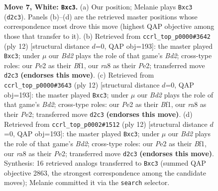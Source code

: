 \documentclass[11pt]{article}
\begin{document}
\begin{figure}[p]
\caption{\textbf{Move 7, White: \texttt{Bxc3}.} (a) Our position; Melanie plays \texttt{Bxc3} (\texttt{d2c3}). Panels (b)--(d) are the retrieved master positions whose correspondence most drove this move (highest QAP objective among those that transfer to it). (b) Retrieved from \texttt{ccrl\_top\_p0000\#3642} (ply 12) [structural distance $d$=0, QAP obj=193]: the master played \texttt{Bxc3}; under $\mu$ our \emph{Bd2} plays the role of that game's \emph{Bd2}; cross-type roles: our \emph{P}e2 as their \emph{B}f1, our \emph{r}a8 as their \emph{P}e2; transferred move \texttt{d2c3} \textbf{(endorses this move)}. (c) Retrieved from \texttt{ccrl\_top\_p0000\#3643} (ply 12) [structural distance $d$=0, QAP obj=193]: the master played \texttt{Bxc3}; under $\mu$ our \emph{Bd2} plays the role of that game's \emph{Bd2}; cross-type roles: our \emph{P}e2 as their \emph{B}f1, our \emph{r}a8 as their \emph{P}e2; transferred move \texttt{d2c3} \textbf{(endorses this move)}. (d) Retrieved from \texttt{ccrl\_top\_p0002\#1512} (ply 12) [structural distance $d$=0, QAP obj=193]: the master played \texttt{Bxc3}; under $\mu$ our \emph{Bd2} plays the role of that game's \emph{Bd2}; cross-type roles: our \emph{P}e2 as their \emph{B}f1, our \emph{r}a8 as their \emph{P}e2; transferred move \texttt{d2c3} \textbf{(endorses this move)}. Synthesis: 16 retrieved analogs transferred to \texttt{Bxc3} (summed QAP objective 2863, the strongest correspondence among the candidate moves); Melanie committed it via the \texttt{search} selector.}
\label{fig:thought-m12}
\end{figure}

\clearpage
\end{document}
